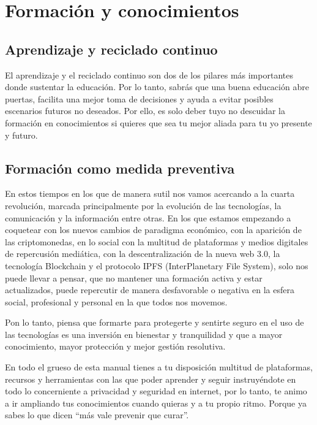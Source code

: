 \documentclass[
  spanish,
  a4paper,
  openany]{book}
\begin{document}
\hypertarget{formaciuxf3n-y-conocimientos}{%
\chapter{Formación y conocimientos}\label{formaciuxf3n-y-conocimientos}}

\hypertarget{aprendizaje-y-reciclado-continuo}{%
\section{Aprendizaje y reciclado continuo}\label{aprendizaje-y-reciclado-continuo}}

El aprendizaje y el reciclado continuo son dos de los pilares más importantes donde sustentar la educación. Por lo tanto, sabrás que una buena educación abre puertas, facilita una mejor toma de decisiones y ayuda a evitar posibles escenarios futuros no deseados. Por ello, es solo deber tuyo no descuidar la formación en conocimientos si quieres que sea tu mejor aliada para tu yo presente y futuro.

\hypertarget{formaciuxf3n-como-medida-preventiva}{%
\section{Formación como medida preventiva}\label{formaciuxf3n-como-medida-preventiva}}

En estos tiempos en los que de manera sutil nos vamos acercando a la cuarta revolución, marcada principalmente por la evolución de las tecnologías, la comunicación y la información entre otras. En los que estamos empezando a coquetear con los nuevos cambios de paradigma económico, con la aparición de las criptomonedas, en lo social con la multitud de plataformas y medios digitales de repercusión mediática, con la descentralización de la nueva web 3.0, la tecnología Blockchain y el protocolo IPFS (InterPlanetary File System), solo nos puede llevar a pensar, que no mantener una formación activa y estar actualizados, puede repercutir de manera desfavorable o negativa en la esfera social, profesional y personal en la que todos nos movemos.

Pon lo tanto, piensa que formarte para protegerte y sentirte seguro en el uso de las tecnologías es una inversión en bienestar y tranquilidad y que a mayor conocimiento, mayor protección y mejor gestión resolutiva.

En todo el grueso de esta manual tienes a tu disposición multitud de plataformas, recursos y herramientas con las que poder aprender y seguir instruyéndote en todo lo concerniente a privacidad y seguridad en internet, por lo tanto, te animo a ir ampliando tus conocimientos cuando quieras y a tu propio ritmo. Porque ya sabes lo que dicen ``más vale prevenir que curar''.
\end{document}
